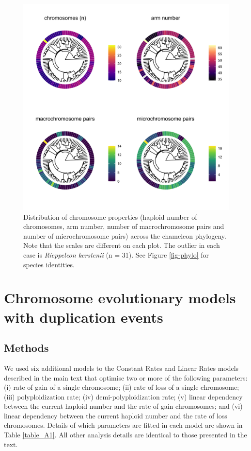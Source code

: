 \documentclass[a4paper, 12pt]{article}
\begin{document}
\newpage
\begin{figure}[h]
 \centering
  \includegraphics[width = \linewidth]{figures/trees-chromosome-properties.png}
  \caption{Distribution of chromosome properties (haploid number of chromosomes, arm number, number of macrochromosome pairs and number of microchromosome pairs) across the chameleon phylogeny. Note that the scales are different on each plot. The outlier in each case is \textit{Rieppeleon kerstenii} (n = 31). See Figure \ref{fig-phylo} for species identities.
}
  \label{fig-properties}
\end{figure} 

\newpage
\section{Chromosome evolutionary models with duplication events}

\subsection{Methods}

We used six additional models to the Constant Rates and Linear Rates models described in the main text that optimise two or more of the following parameters: (i) rate of gain of a single chromosome; (ii) rate of loss of a single chromosome; (iii) polyploidization rate; (iv) demi-polyploidization rate; (v) linear dependency between the current haploid number and the rate of gain chromosomes; and (vi) linear dependency between the current haploid number and the rate of loss chromosomes. Details of which parameters are fitted in each model are shown in Table \ref{table_A1}. All other analysis details are identical to those presented in the text.
\end{document}
